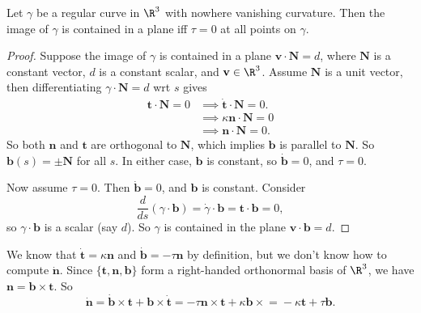 \begin{prop}
    Let $\gamma $ be a regular curve  in $\R^3$ with nowhere vanishing curvature. Then the image of $\gamma $ is contained in a plane iff $\tau=0$ at all points on $\gamma $.
\end{prop}
\begin{proof}
    Suppose the image of $\gamma $ is contained in a plane $\mathbf v\cdot \mathbf N=d$, where $\mathbf N$ is a constant vector, $d$ is a constant scalar, and $\mathbf v \in \R^3$. Assume $\mathbf N$ is a unit vector, then differentiating $\gamma \cdot \mathbf N=d$ wrt $s$ gives 
    \begin{align*}
        \mathbf t \cdot \mathbf N=0 &\implies \dot{\mathbf t}\cdot \mathbf N=0.\\
                                    &\implies \kappa \mathbf n\cdot \mathbf N=0\\
                                    &\implies \mathbf n\cdot \mathbf N=0.
    \end{align*} So both $\mathbf n$ and $\mathbf t$ are orthogonal to $\mathbf N$, which implies $\mathbf b$ is parallel to $\mathbf N$. So $\mathbf b(s)=\pm\mathbf N$ for all $s$. In either case, $\mathbf b$ is constant, so $\dot{\mathbf b}=0$, and $\tau=0$.

    Now assume $\tau=0$. Then $\dot {\mathbf b}=0$, and $\mathbf b$ is constant. Consider \[
        \frac{d}{ds}(\gamma \cdot \mathbf b)=\dot\gamma \cdot \mathbf b=\mathbf t\cdot \mathbf b=0,
    \] so $\gamma \cdot \mathbf b$ is a scalar (say $d$). So $\gamma $ is contained in the plane $\mathbf v\cdot \mathbf b=d$.
\end{proof}
We know that $\dot{\mathbf t}=\kappa\mathbf n$ and $\dot{\mathbf b}=-\tau \mathbf n$ by definition, but we don't know how to compute $\dot{\mathbf n}$. Since $\{\mathbf t,\mathbf n,\mathbf b\} $ form a right-handed orthonormal basis of $\R^3$, we have $\mathbf n=\mathbf b\times \mathbf t$. So \[
    \dot{\mathbf n}=\dot{\mathbf b}\times \mathbf t+\mathbf b\times \dot{\mathbf t}=-\tau \mathbf n \times \mathbf t+\kappa\mathbf b\times \mathbf =-\kappa\mathbf t+\tau \mathbf b.
\] 
